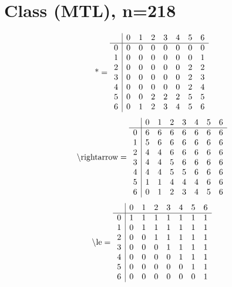 \documentclass[11pt]{article}
\begin{document}
\section{Class (MTL), n=218}
\[\text{*} = 
\begin{array}{r | r r r r r r r}
 & 0 & 1 & 2 & 3 & 4 & 5 & 6 \\ \hline
0 & 0 & 0 & 0 & 0 & 0 & 0 & 0 \\
1 & 0 & 0 & 0 & 0 & 0 & 0 & 1 \\
2 & 0 & 0 & 0 & 0 & 0 & 2 & 2 \\
3 & 0 & 0 & 0 & 0 & 0 & 2 & 3 \\
4 & 0 & 0 & 0 & 0 & 0 & 2 & 4 \\
5 & 0 & 0 & 2 & 2 & 2 & 5 & 5 \\
6 & 0 & 1 & 2 & 3 & 4 & 5 & 6 \\
\end{array}
\]
\[\text{\textbackslash rightarrow} = 
\begin{array}{r | r r r r r r r}
 & 0 & 1 & 2 & 3 & 4 & 5 & 6 \\ \hline
0 & 6 & 6 & 6 & 6 & 6 & 6 & 6 \\
1 & 5 & 6 & 6 & 6 & 6 & 6 & 6 \\
2 & 4 & 4 & 6 & 6 & 6 & 6 & 6 \\
3 & 4 & 4 & 5 & 6 & 6 & 6 & 6 \\
4 & 4 & 4 & 5 & 5 & 6 & 6 & 6 \\
5 & 1 & 1 & 4 & 4 & 4 & 6 & 6 \\
6 & 0 & 1 & 2 & 3 & 4 & 5 & 6 \\
\end{array}
\]
\[\text{\textbackslash le} = 
\begin{array}{r | r r r r r r r}
 & 0 & 1 & 2 & 3 & 4 & 5 & 6 \\ \hline
0 & 1 & 1 & 1 & 1 & 1 & 1 & 1 \\
1 & 0 & 1 & 1 & 1 & 1 & 1 & 1 \\
2 & 0 & 0 & 1 & 1 & 1 & 1 & 1 \\
3 & 0 & 0 & 0 & 1 & 1 & 1 & 1 \\
4 & 0 & 0 & 0 & 0 & 1 & 1 & 1 \\
5 & 0 & 0 & 0 & 0 & 0 & 1 & 1 \\
6 & 0 & 0 & 0 & 0 & 0 & 0 & 1 \\
\end{array}
\]
\end{document}
